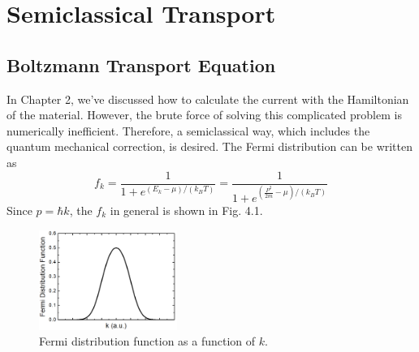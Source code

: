 \chapter{Semiclassical Transport}
\section{Boltzmann Transport Equation}
In Chapter 2, we've discussed how to calculate the current with the Hamiltonian of the material. However, the brute force of solving this complicated problem is numerically inefficient. Therefore, a semiclassical way, which includes the quantum mechanical correction, is desired. The Fermi distribution can be written as \begin{equation}
    f_{k} = \frac{1}{1+e^{(E_{k}-\mu)/(k_{B}T)}} = \frac{1}{1+e^{(\frac{P^{2}}{2m}-\mu)/(k_{B}T)}}
\end{equation} Since $p = \hbar k$, the $f_{k}$ in general is shown in Fig. 4.1.
\begin{figure}[tbp]
\includegraphics[width=0.4\textwidth]{figures/Fig4_1}
\centering
\caption{\small Fermi distribution function as a function of $k$.}
\end{figure}
